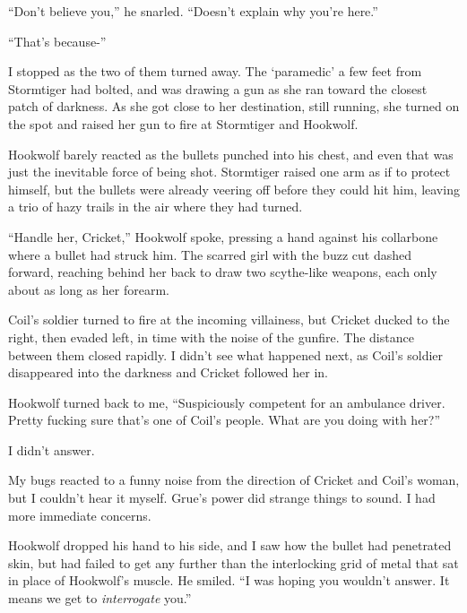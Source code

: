 ``Don't believe you,'' he snarled.  ``Doesn't explain why you're here.''



``That's because-''



I stopped as the two of them turned away.  The `paramedic' a few feet from Stormtiger had bolted, and was drawing a gun as she ran toward the closest patch of darkness.  As she got close to her destination, still running, she turned on the spot and raised her gun to fire at Stormtiger and Hookwolf.



Hookwolf barely reacted as the bullets punched into his chest, and even that was just the inevitable force of being shot.  Stormtiger raised one arm as if to protect himself, but the bullets were already veering off before they could hit him, leaving a trio of hazy trails in the air where they had turned.



``Handle her, Cricket,'' Hookwolf spoke, pressing a hand against his collarbone where a bullet had struck him.  The scarred girl with the buzz cut dashed forward, reaching behind her back to draw two scythe-like weapons, each only about as long as her forearm.



Coil's soldier turned to fire at the incoming villainess, but Cricket ducked to the right, then evaded left, in time with the noise of the gunfire.  The distance between them closed rapidly.  I didn't see what happened next, as Coil's soldier disappeared into the darkness and Cricket followed her in.



Hookwolf turned back to me, ``Suspiciously competent for an ambulance driver.  Pretty fucking sure that's one of Coil's people.  What are you doing with her?''



I didn't answer.



My bugs reacted to a funny noise from the direction of Cricket and Coil's woman, but I couldn't hear it myself.  Grue's power did strange things to sound.  I had more immediate concerns.



Hookwolf dropped his hand to his side, and I saw how the bullet had penetrated skin, but had failed to get any further than the interlocking grid of metal that sat in place of Hookwolf's muscle.  He smiled.  ``I was hoping you wouldn't answer.  It means we get to \emph{interrogate} you.''



